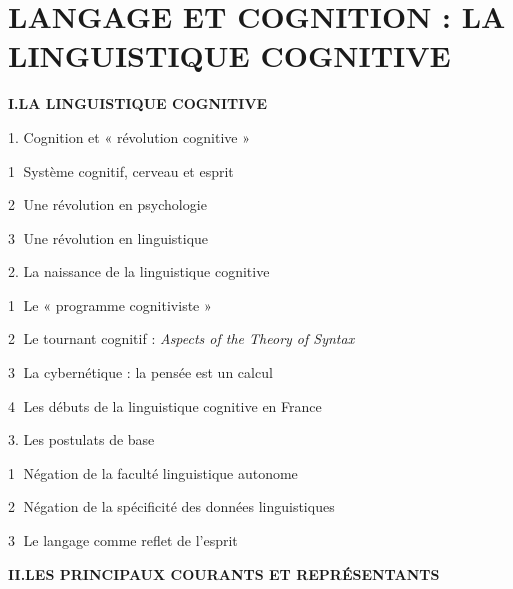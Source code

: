 \chapter{LANGAGE ET COGNITION : LA LINGUISTIQUE COGNITIVE}
\label{chapter-16}
\begin{keybox}
\small{}
\textbf{I.\quad LA LINGUISTIQUE COGNITIVE}\par
\hspace*{1em}1. Cognition et « révolution cognitive »\par
\hspace*{2em}\textcircled{\scriptsize 1} Système cognitif, cerveau et esprit\par
\hspace*{2em}\textcircled{\scriptsize 2} Une révolution en psychologie\par
\hspace*{2em}\textcircled{\scriptsize 3} Une révolution en linguistique\par
\hspace*{1em}2. La naissance de la linguistique cognitive\par
\hspace*{2em}\textcircled{\scriptsize 1} Le « programme cognitiviste »\par
\hspace*{2em}\textcircled{\scriptsize 2} Le tournant cognitif : \emph{Aspects of the Theory of Syntax}\par
\hspace*{2em}\textcircled{\scriptsize 3} La cybernétique : la pensée est un calcul\par
\hspace*{2em}\textcircled{\scriptsize 4} Les débuts de la linguistique cognitive en France\par
\hspace*{1em}3. Les postulats de base\par
\hspace*{2em}\textcircled{\scriptsize 1} Négation de la faculté linguistique autonome\par
\hspace*{2em}\textcircled{\scriptsize 2} Négation de la spécificité des données linguistiques\par
\hspace*{2em}\textcircled{\scriptsize 3} Le langage comme reflet de l’esprit\par
\medskip
\textbf{II.\quad LES PRINCIPAUX COURANTS ET REPRÉSENTANTS}\par

\end{keybox}
